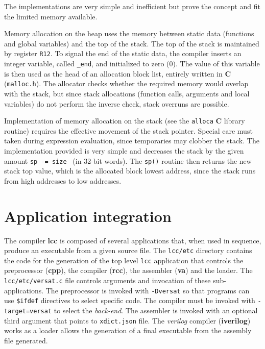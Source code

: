 The implementations are very simple and inefficient but
prove the concept and fit the limited memory available.

Memory allocation on the heap uses the memory between static data (functions
and global variables) and the top of the stack.
The top of the stack is maintained by register {\tt R12}.
To signal the end of the static data, the compiler inserts an integer
variable, called {\tt \_end}, and initialized to zero ($0$).
The value of this variable is then used as the head of an allocation block
list, entirely written in {\bf C} ({\tt malloc.h}).
The allocator checks whether the required memory would overlap with the stack,
but since stack allocations (function calls, arguments and local variables)
do not perform the inverse check, stack overruns are possible.

Implementation of memory allocation on the stack (see the {\tt alloca}
{\bf C} library routine) requires the effective movement of the stack pointer.
Special care must taken during expression evaluation, since temporaries may
clobber the stack.
The implementation provided is very simple and decreases the stack by the
given amount {\tt sp -= size } (in 32-bit words).
The {\tt sp()} routine then returns the new stack top value, which is the
allocated block lowest address, since the stack runs from high addresses
to low addresses.


\section{Application integration}\label{app:integ}

The compiler {\bf lcc} is composed of several applications
that, when used in sequence, produce an executable from
a given source file.
The {\tt lcc/etc} directory contains the code for the
generation of the top level {\tt lcc} application that
controls the preprocessor ({\bf cpp}), the compiler
({\bf rcc}),  the assembler ({\bf va}) and the loader.
The {\tt lcc/etc/versat.c} file controls arguments and
invocation of these sub-applications.
The preprocessor is invoked with \verb|-Dversat| so that
programs can use \verb|$ifdef| directives to select
specific code.
The compiler must be invoked with \verb|-target=versat|
to select the {\it back-end}.
The assembler is invoked with an optional third argument
that points to \verb|xdict.json| file.
The {\it verilog} compiler ({\bf iverilog}) works as a loader
allows the generation of a final executable from the
assembly file generated.


